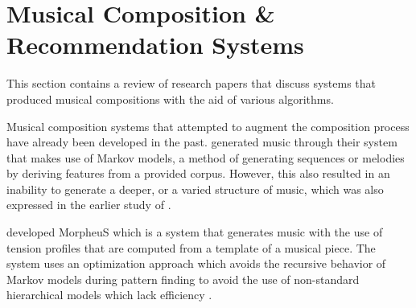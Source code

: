 \section{Musical Composition \& Recommendation Systems}
This section contains a review of research papers that discuss systems that produced musical compositions with the aid of various algorithms.

Musical composition systems that attempted to augment the composition process have already been developed in the past. \citet{eigenfeldt2010realtime} generated music through their system that makes use of Markov models, a method of generating sequences or melodies by deriving features from a provided corpus. However, this also resulted in an inability to generate a deeper, or a varied structure of music, which was also expressed in the earlier study of \citet{ames1989markov}. 


\citet{herremans2016morpheus} developed MorpheuS which is a system that generates music with the use of tension profiles that are computed from a template of a musical piece. The system uses an optimization approach which avoids the recursive behavior of Markov models during pattern finding to avoid the use of non-standard hierarchical models which lack efficiency \citep{herremans2016morpheus}. 

\begin{comment}
There are other approaches which yield more efficient results \citep{damlen1999gibbs}. COSIATEC and SIATECCompress are two greedy compression algorithms used by MorpheuS that find patterns in a given template piece.
\end{comment}


